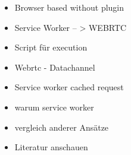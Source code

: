 \begin{itemize}
	\item Browser based without plugin
	\item Service Worker -- > WEBRTC
	\item Script für execution
	\item Webrtc - Datachannel
	\item Service worker cached request
	\item warum service worker
	\item 	vergleich anderer Ansätze
	\item 	Literatur anschauen
\end{itemize}
%
%
%
%
